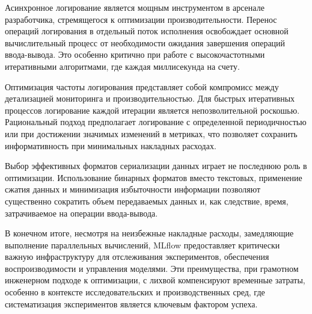 Асинхронное логирование является мощным инструментом в арсенале разработчика, стремящегося к оптимизации производительности. Перенос операций логирования в отдельный поток исполнения освобождает основной вычислительный процесс от необходимости ожидания завершения операций ввода-вывода. Это особенно критично при работе с высокочастотными итеративными алгоритмами, где каждая миллисекунда на счету.

Оптимизация частоты логирования представляет собой компромисс между детализацией мониторинга и производительностью. Для быстрых итеративных процессов логирование каждой итерации является непозволительной роскошью. Рациональный подход предполагает логирование с определенной периодичностью или при достижении значимых изменений в метриках, что позволяет сохранить информативность при минимальных накладных расходах.

Выбор эффективных форматов сериализации данных играет не последнюю роль в оптимизации. Использование бинарных форматов вместо текстовых, применение сжатия данных и минимизация избыточности информации позволяют существенно сократить объем передаваемых данных и, как следствие, время, затрачиваемое на операции ввода-вывода.

В конечном итоге, несмотря на неизбежные накладные расходы, замедляющие выполнение параллельных вычислений, MLflow предоставляет критически важную инфраструктуру для отслеживания экспериментов, обеспечения воспроизводимости и управления моделями. Эти преимущества, при грамотном инженерном подходе к оптимизации, с лихвой компенсируют временные затраты, особенно в контексте исследовательских и производственных сред, где систематизация экспериментов является ключевым фактором успеха.
